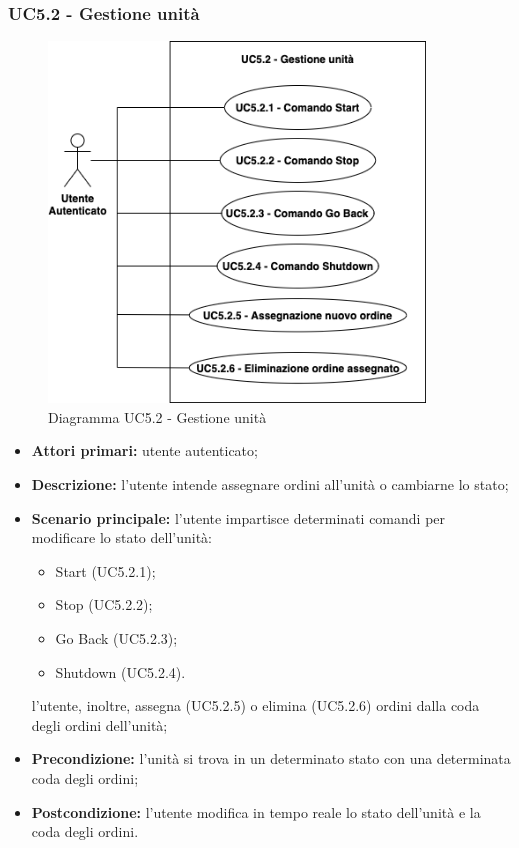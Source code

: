     \subsubsection{UC5.2 - Gestione unità}
    \begin{figure}[h!]
        \centering
        \includegraphics[width=10cm]{images/uc5.2.png}
        \caption{Diagramma UC5.2 - Gestione unità}
    \end{figure}
    \begin{itemize}
        \item \textbf{Attori primari:} utente autenticato;
        \item \textbf{Descrizione:} l'utente intende assegnare ordini all'unità o cambiarne lo stato;
        \item \textbf{Scenario principale:} l'utente impartisce determinati comandi per modificare lo stato dell'unità:
        \begin{itemize}
            \item Start (UC5.2.1);
            \item Stop (UC5.2.2);
            \item Go Back (UC5.2.3);
            \item Shutdown (UC5.2.4).
        \end{itemize}
        l'utente, inoltre, assegna (UC5.2.5) o elimina (UC5.2.6) ordini dalla coda degli ordini dell'unità;
        \item \textbf{Precondizione:} l'unità si trova in un determinato stato con una determinata coda degli ordini;
        \item \textbf{Postcondizione:} l'utente modifica in tempo reale lo stato dell'unità e la coda degli ordini.
    \end{itemize}

